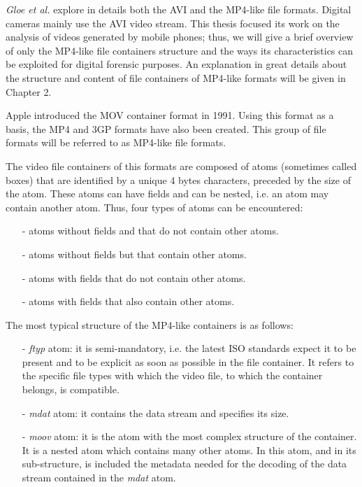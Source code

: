 \emph{Gloe et al.} \cite{Gloe2014S68} explore in details both the AVI \cite{avi} and the MP4-like file formats. Digital cameras mainly use the AVI video stream. This thesis focused its work on the analysis of videos generated by mobile phones; thus, we will give a brief overview of only the MP4-like file containers structure and the ways its characteristics can be exploited for digital forensic purposes. An explanation in great details about the structure and content of file containers of MP4-like formats will be given in Chapter 2.

Apple introduced the MOV \cite{mov} container format in 1991. Using this format as a basis, the MP4 \cite{mp4} and 3GP formats have also been created. This group of file formats will be referred to as MP4-like file formats.

The video file containers of this formats are composed of atoms (sometimes called boxes) that are identified by a unique 4 bytes characters, preceded by the size of the atom. These atoms can have fields and can be nested, i.e. an atom may contain another atom. Thus, four types of atoms can be encountered:
\begin{itemize}
\item[-] atoms without fields and that do not contain other atoms.
\item[-] atoms without fields but that contain other atoms.
\item[-] atoms with fields that do not contain other atoms.
\item[-] atoms with fields that also contain other atoms.
\end{itemize}

The most typical structure of the MP4-like containers is as follows:
\begin{itemize}
\item[-] \emph{ftyp} atom: it is semi-mandatory, i.e. the latest ISO standards expect it to be present and to be explicit as soon as possible in the file container. It refers to the specific file types with which the video file, to which the container belongs, is compatible.
\item[-] \emph{mdat} atom: it contains the data stream and specifies its size.
\item[-] \emph{moov} atom: it is the atom with the most complex structure of the container. It is a nested atom which contains many other atoms. In this atom, and in its sub-structure, is included the metadata needed for the decoding of the data stream contained in the \emph{mdat} atom.
\end{itemize}

